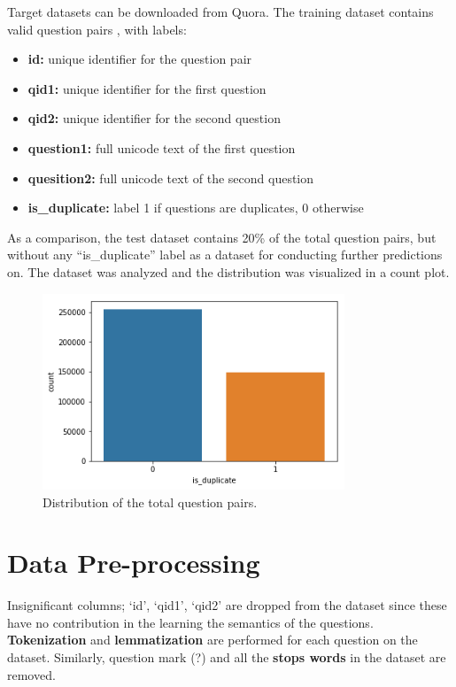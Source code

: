 Target datasets can be downloaded from Quora. The training dataset contains valid question pairs , with labels: 
\begin{itemize}
	\item \textbf{id:} unique identifier for the question pair
	\item \textbf{qid1:} unique identifier for the first question
	\item \textbf{qid2:} unique identifier for the second question
	\item \textbf{question1:} full unicode text of the first question 
	\item \textbf{quesition2:} full unicode text of the second question 
	\item \textbf{is\_duplicate:} label 1 if questions are duplicates, 0 otherwise 
\end{itemize}
As a comparison, the test dataset contains 20\% of the total question pairs, but without any ``is\_duplicate'' label as a dataset for conducting further predictions on. The dataset was analyzed and the distribution was visualized in a count plot.
\begin{figure}[H]
\begin{center}
	\includegraphics[width = 3.55in]{images/count.png}
	\caption{Distribution of the total question pairs.}
\end{center}
\end{figure}

\section{Data Pre-processing}
Insignificant columns; `id', `qid1', `qid2' are dropped from the dataset since these have no contribution in the learning the semantics of the questions. \textbf{Tokenization} and \textbf{lemmatization} are performed for each question on the dataset. Similarly, question mark (?) and all the \textbf{stops words} in the dataset are removed.

